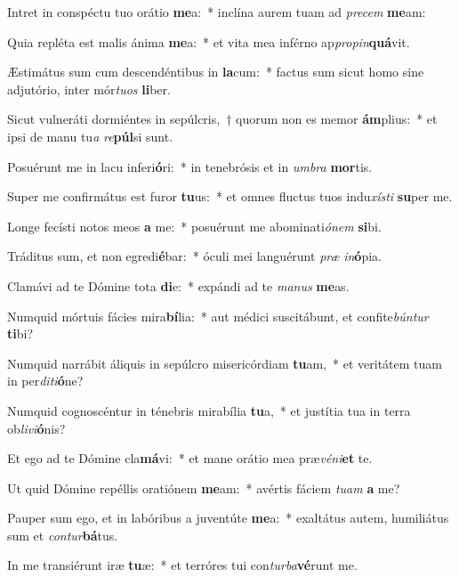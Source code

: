 \item Intret in conspéctu tuo orátio \textbf{me}a:~* inclína aurem tuam ad \textit{precem} \textbf{me}am:
\item Quia repléta est malis ánima \textbf{me}a:~* et vita mea inférno ap\textit{propin}\textbf{quá}vit.
\item Æstimátus sum cum descendéntibus in \textbf{la}cum:~* factus sum sicut homo sine adjutório, inter mór\textit{tuos} \textbf{li}ber.
\item Sicut vulneráti dormiéntes in sepúlcris,~† quorum non es memor \textbf{ám}plius:~* et ipsi de manu tu\hspace{0.03em}\textit{a} \textit{re}\textbf{púl}si sunt.
\item Posuérunt me in lacu inferi\textbf{ó}ri:~* in tenebrósis et in \textit{umbra} \textbf{mor}tis.
\item Super me confirmátus est furor \textbf{tu}us:~* et omnes fluctus tuos indu\hspace{0.03em}\textit{xísti} \textbf{su}per me.
\item Longe fecísti notos meos \textbf{a} me:~* posuérunt me abominati\hspace{0.03em}\textit{ónem} \textbf{si}bi.
\item Tráditus sum, et non egredi\textbf{é}bar:~* óculi mei languérunt \textit{præ} \textit{in}\textbf{ó}pia.
\item Clamávi ad te Dómine tota \textbf{di}e:~* expándi ad te \textit{manus} \textbf{me}as.
\item Numquid mórtuis fácies mira\textbf{bí}lia:~* aut médici suscitábunt, et confite\hspace*{0.03em}\textit{búntur} \textbf{ti}bi?
\item Numquid narrábit áliquis in sepúlcro misericórdiam \textbf{tu}am,~* et veritátem tuam in per\textit{diti}\textbf{ó}ne?
\item Numquid cognoscéntur in ténebris mirabília \textbf{tu}a,~* et justítia tua in terra ob\hspace*{0.03em}\textit{livi}\textbf{ó}nis?
\item Et ego ad te Dómine cla\textbf{má}vi:~* et mane orátio mea præ\textit{véni}\textbf{et} te.
\item Ut quid Dómine repéllis oratiónem \textbf{me}am:~* avértis fáciem \textit{tuam} \textbf{a} me?
\item Pauper sum ego, et in labóribus a juventúte \textbf{me}a:~* exaltátus autem, humiliátus sum et \textit{contur}\textbf{bá}tus.
\item In me transiérunt iræ \textbf{tu}æ:~* et terróres tui con\hspace*{0.03em}\textit{turba}\textbf{vé}runt me.
